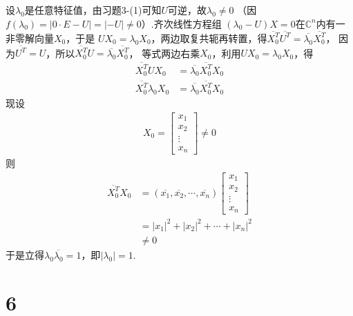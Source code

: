 \documentclass{article}
\begin{document}
设$\lambda_0$是任意特征值，由习题3-(1)可知$U$可逆，故$\lambda_0 \neq 0$
（因$f(\lambda_0) = |0 \cdot E - U| = |-U| \neq 0$）.齐次线性方程组
$(\lambda_0 - U) X = 0$在$\mathbb{C}^n$内有一非零解向量$X_0$，于是
$U X_0 = \lambda_0 X_0$，两边取复共轭再转置，得$\overline{X_0^T} \overline{U^T} = \overline{\lambda_0} \overline{X_0^T}$，
因为$\overline{U^T} = U$，所以$\overline{X_0^T} U = \overline{\lambda_0} \overline{X_0^T}$，
等式两边右乘$X_0$，利用$UX_0 = \lambda_0 X_0$，得
\begin{align*}
  \overline{X_0^T} U X_0         & = \overline{\lambda_0} \overline{X_0^T} X_0 \\
  \overline{X_0^T} \lambda_0 X_0 & = \overline{\lambda_0} \overline{X_0^T} X_0
\end{align*}
现设
\begin{align*}
  X_0 = \begin{bmatrix}
          x_{1}  \\
          x_{2}  \\
          \vdots \\
          x_{n}
        \end{bmatrix}
  \neq 0
\end{align*}
则
\begin{align*}
  \overline{X_0^T} X_0 & = (\overline{x_1}, \overline{x_2}, \cdots, \overline{x_n}) \begin{bmatrix}
                                                                                      x_{1}  \\
                                                                                      x_{2}  \\
                                                                                      \vdots \\
                                                                                      x_{n}
                                                                                    \end{bmatrix} \\
                       & = |x_1|^2 + |x_2|^2 + \cdots + |x_n|^2                                    \\
                       & \neq 0
\end{align*}
于是立得$\lambda_0 \overline{\lambda_0} = 1$，即$|\lambda_0| = 1$.

\section*{6}
\end{document}
